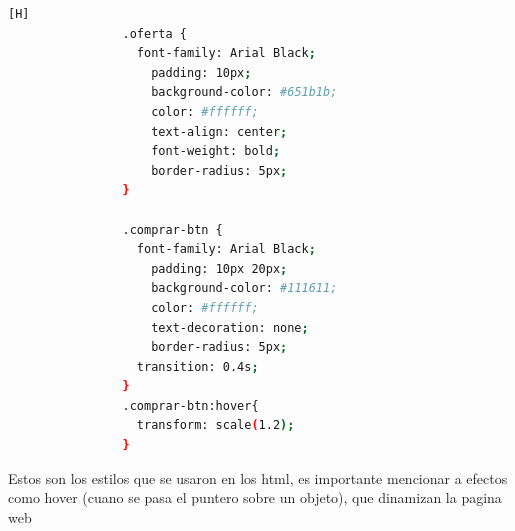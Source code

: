 \documentclass{article}
\begin{document}
\begin{lstlisting}[language=bash,caption={styles.css}][H]
                .oferta {
                  font-family: Arial Black;
                    padding: 10px;
                    background-color: #651b1b;
                    color: #ffffff;
                    text-align: center;
                    font-weight: bold;
                    border-radius: 5px;
                }
                
                .comprar-btn {
                  font-family: Arial Black;
                    padding: 10px 20px;
                    background-color: #111611;
                    color: #ffffff;
                    text-decoration: none;
                    border-radius: 5px;
                  transition: 0.4s;
                }
                .comprar-btn:hover{
                  transform: scale(1.2);
                }
	\end{lstlisting}
        Estos son los estilos que se usaron en los html, es importante mencionar a efectos como hover (cuano se pasa el puntero sobre un objeto), que dinamizan la pagina web\newline\newline
\end{document}
